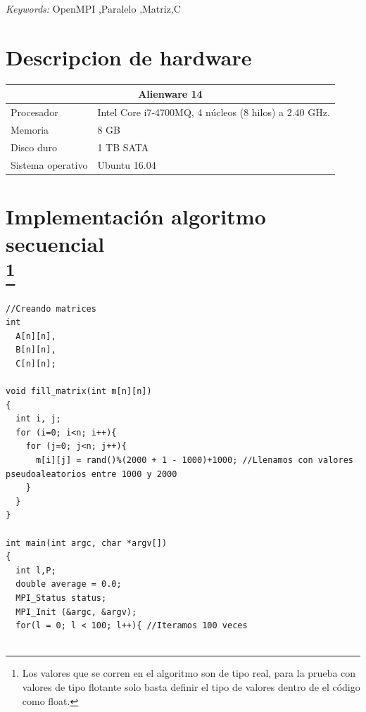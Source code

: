 \documentclass[12pt]{article}
\begin{document}
\begin{titlepage}
\hspace*{3,6mm}\textit{Keywords:} OpenMPI ,Paralelo ,Matriz,C%

\vspace{30pt} %


\section*{Descripcion de hardware}
\begin{table}[htb]
\centering
\begin{tabular}{| p{4.2cm}| p{10.2cm} |}
\hline
\multicolumn{2}{|c|}{Alienware 14} \\
\hline
Procesador & Intel Core i7-4700MQ, 4 núcleos (8 hilos) a 2.40 GHz. \\
\hline \hline
Memoria & 8 GB \\ \hline
Disco duro & 1 TB SATA \\ \hline
Sistema operativo & Ubuntu 16.04 \\ \hline
\end{tabular}
\label{tabla:anchofijo}
\end{table}
\clearpage
\section*{Implementación algoritmo secuencial\\ \footnote{Los valores que se corren en el algoritmo son de tipo real, para la prueba con valores de tipo flotante solo basta definir el tipo de valores dentro de el código como float.}}
\lstset{language=C, breaklines=true, basicstyle=\footnotesize}
\begin{lstlisting}[frame=single]
//Creando matrices
int 
  A[n][n], 
  B[n][n], 
  C[n][n];

void fill_matrix(int m[n][n])
{
  int i, j;
  for (i=0; i<n; i++){
    for (j=0; j<n; j++){
      m[i][j] = rand()%(2000 + 1 - 1000)+1000; //Llenamos con valores pseudoaleatorios entre 1000 y 2000
    }
  }
}

int main(int argc, char *argv[])
{
  int l,P;
  double average = 0.0;
  MPI_Status status;  
  MPI_Init (&argc, &argv);
  for(l = 0; l < 100; l++){ //Iteramos 100 veces
  

\end{lstlisting}
\end{titlepage}
\end{document}
